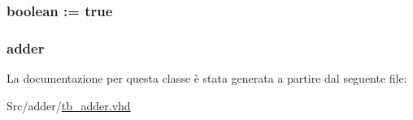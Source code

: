 \subsubsection[{\texorpdfstring{use\+\_\+custom}{use_custom}}]{ {\bfseries \textcolor{vhdlchar}{boolean}\textcolor{vhdlchar}{ }\textcolor{vhdlchar}{ }\textcolor{vhdlchar}{\+:}\textcolor{vhdlchar}{=}\textcolor{vhdlchar}{ }\textcolor{vhdlchar}{ }\textcolor{vhdlchar}{ }\textcolor{vhdlchar}{ }\textcolor{vhdlchar}{true}\textcolor{vhdlchar}{ }} \hspace{0.3cm}{\ttfamily [Constant]}}\hypertarget{classtb__adder_1_1behavior_ae53b6cfbb1b5d32c932c417636d6ac3c}{}\label{classtb__adder_1_1behavior_ae53b6cfbb1b5d32c932c417636d6ac3c}
\subsubsection[{\texorpdfstring{uut}{uut}}]{ {\bfseries \textcolor{vhdlchar}{adder}\textcolor{vhdlchar}{ }} \hspace{0.3cm}{\ttfamily [Instantiation]}}\hypertarget{classtb__adder_1_1behavior_a1619316ad715601eb5d3559db829ac05}{}\label{classtb__adder_1_1behavior_a1619316ad715601eb5d3559db829ac05}


La documentazione per questa classe è stata generata a partire dal seguente file\+:\begin{DoxyCompactItemize}
\item 
Src/adder/\hyperlink{tb__adder_8vhd}{tb\+\_\+adder.\+vhd}\end{DoxyCompactItemize}
